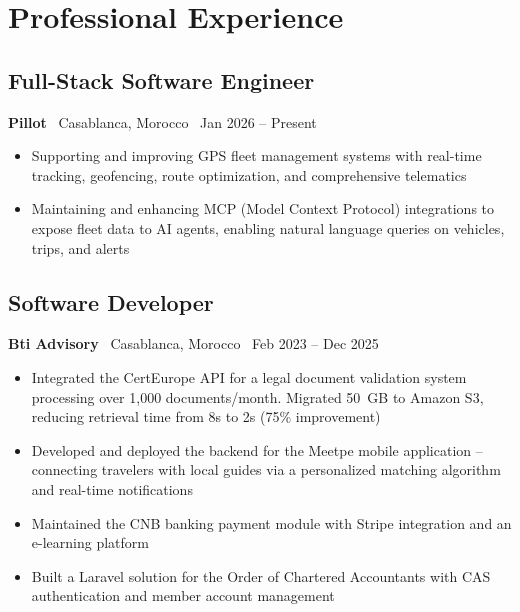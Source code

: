 \documentclass[10pt,a4paper]{article}
\begin{document}
\section*{Professional Experience}

\subsection*{Full-Stack Software Engineer}
{\small \textbf{Pillot} \textbar\ Casablanca, Morocco \textbar\ Jan 2026 -- Present}
\vspace{2pt}
\begin{itemize}
  \item {\small Supporting and improving GPS fleet management systems with real-time tracking, geofencing, route optimization, and comprehensive telematics}
  \item {\small Maintaining and enhancing MCP (Model Context Protocol) integrations to expose fleet data to AI agents, enabling natural language queries on vehicles, trips, and alerts}
\end{itemize}
\vspace{2pt}

\subsection*{Software Developer}
{\small \textbf{Bti Advisory} \textbar\ Casablanca, Morocco \textbar\ Feb 2023 -- Dec 2025}
\vspace{2pt}
\begin{itemize}
  \item {\small Integrated the CertEurope API for a legal document validation system processing over 1,000 documents/month. Migrated 50~GB to Amazon S3, reducing retrieval time from 8s to 2s (75\% improvement)}
  \item {\small Developed and deployed the backend for the Meetpe mobile application -- connecting travelers with local guides via a personalized matching algorithm and real-time notifications}
  \item {\small Maintained the CNB banking payment module with Stripe integration and an e-learning platform}
  \item {\small Built a Laravel solution for the Order of Chartered Accountants with CAS authentication and member account management}
\end{itemize}
\vspace{2pt}
\end{document}
